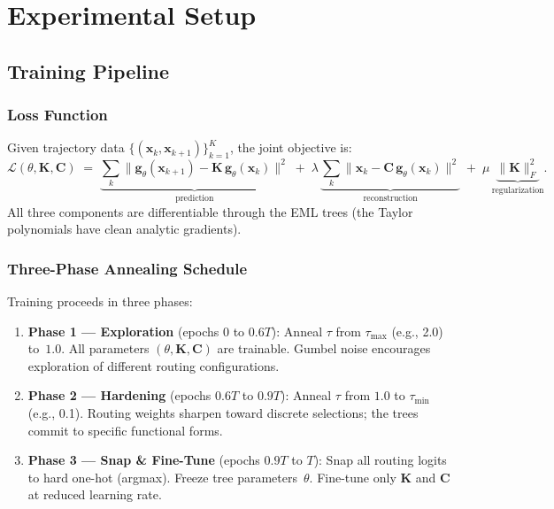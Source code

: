 \documentclass[11pt]{article}
\newcommand{\bx}{\mathbf{x}}
\newcommand{\bg}{\mathbf{g}}
\newcommand{\bK}{\mathbf{K}}
\newcommand{\bC}{\mathbf{C}}
\newcommand{\cL}{\mathcal{L}}
\begin{document}
\section{Experimental Setup}
\label{sec:experiments}

\subsection{Training Pipeline}
\label{sec:training}

\subsubsection{Loss Function}

Given trajectory data $\{(\bx_k, \bx_{k+1})\}_{k=1}^{K}$, the joint objective is:
\begin{equation}\label{eq:loss}
  \cL(\theta, \bK, \bC) \;=\;
  \underbrace{\sum_k \bigl\|\bg_\theta(\bx_{k+1}) - \bK\,\bg_\theta(\bx_k)\bigr\|^2}%
  _{\text{prediction}}
  \;+\; \lambda\,
  \underbrace{\sum_k \bigl\|\bx_k - \bC\,\bg_\theta(\bx_k)\bigr\|^2}%
  _{\text{reconstruction}}
  \;+\; \mu\,
  \underbrace{\|\bK\|_F^2}_{\text{regularization}}.
\end{equation}
All three components are differentiable through the EML trees (the Taylor
polynomials have clean analytic gradients).

\subsubsection{Three-Phase Annealing Schedule}

Training proceeds in three phases:

\begin{enumerate}
  \item \textbf{Phase 1 --- Exploration} (epochs $0$ to $0.6T$):
    Anneal $\tau$ from $\tau_{\max}$ (e.g., 2.0) to~$1.0$.  All parameters
    $(\theta, \bK, \bC)$ are trainable.  Gumbel noise encourages exploration of
    different routing configurations.
  \item \textbf{Phase 2 --- Hardening} (epochs $0.6T$ to $0.9T$):
    Anneal $\tau$ from $1.0$ to $\tau_{\min}$ (e.g., 0.1).  Routing weights sharpen
    toward discrete selections; the trees commit to specific functional forms.
  \item \textbf{Phase 3 --- Snap \& Fine-Tune} (epochs $0.9T$ to $T$):
    Snap all routing logits to hard one-hot (argmax).  Freeze tree
    parameters~$\theta$.  Fine-tune only $\bK$ and $\bC$ at reduced learning rate.
\end{enumerate}
\end{document}
